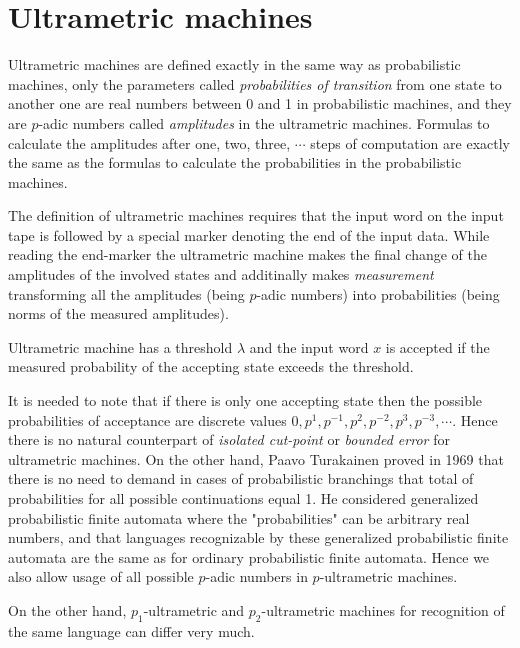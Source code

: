 \documentclass{llncs}
\begin{document}
\section{Ultrametric machines}

Ultrametric machines are defined exactly in the same way as probabilistic machines, only the parameters called {\em probabilities of transition}  from one state
to another one are real numbers between 0 and 1 in probabilistic machines, and they
are $p$-adic numbers called {\em amplitudes} in the ultrametric machines. Formulas to calculate the amplitudes after one, two, three, $\cdots $ steps of computation are exactly the same as the formulas to calculate the probabilities in the probabilistic machines. 


The definition of ultrametric machines requires that the input word on the input tape is followed by a special
marker denoting the end of the input data.  While reading the end-marker the ultrametric machine makes the final change of the amplitudes of the involved states and additinally makes {\em measurement} transforming all the amplitudes (being $p$-adic numbers) into probabilities (being norms of the measured amplitudes).

Ultrametric machine has a threshold $\lambda $ and the input word $x$ is accepted if the measured probability of the accepting state exceeds the threshold.

It is needed to note that if there is only one accepting state then the possible probabilities of acceptance are discrete values $0, p^1, p^{-1}, p^2, p^{-2}, p^3,
p^{-3}, \cdots $. Hence there is no natural counterpart of {\em isolated cut-point} or {\em bounded error} for ultrametric machines. On the other hand, Paavo Turakainen proved in 1969 that there is no need to demand in cases of probabilistic branchings that total of probabilities for all possible continuations equal 1. He considered generalized probabilistic finite automata where the "probabilities" can be arbitrary real numbers, and that languages recognizable by these generalized probabilistic finite automata are the same as for ordinary probabilistic finite automata. Hence we also allow usage of all possible $p$-adic numbers in $p$-ultrametric machines. 

On the other hand, $p_1$-ultrametric and $p_2$-ultrametric machines for recognition of the same language can differ very much. 
\end{document}
